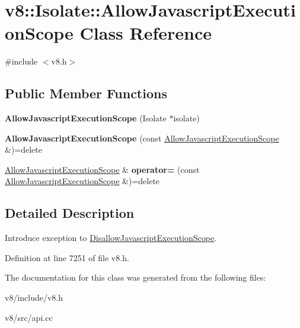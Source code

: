 \hypertarget{classv8_1_1Isolate_1_1AllowJavascriptExecutionScope}{}\section{v8\+:\+:Isolate\+:\+:Allow\+Javascript\+Execution\+Scope Class Reference}
\label{classv8_1_1Isolate_1_1AllowJavascriptExecutionScope}


{\ttfamily \#include $<$v8.\+h$>$}

\subsection*{Public Member Functions}
\begin{DoxyCompactItemize}
\item 
\mbox{\label{classv8_1_1Isolate_1_1AllowJavascriptExecutionScope_ac73a647c33756c6b7c3896170e069e8c}} 
{\bfseries Allow\+Javascript\+Execution\+Scope} (Isolate $\ast$isolate)
\item 
\mbox{\label{classv8_1_1Isolate_1_1AllowJavascriptExecutionScope_a20bf639420617b08404e2bed1b203dbc}} 
{\bfseries Allow\+Javascript\+Execution\+Scope} (const \mbox{\hyperlink{classv8_1_1Isolate_1_1AllowJavascriptExecutionScope}{Allow\+Javascript\+Execution\+Scope}} \&)=delete
\item 
\mbox{\label{classv8_1_1Isolate_1_1AllowJavascriptExecutionScope_a436e3fc96e3796ccfd265a153d71224a}} 
\mbox{\hyperlink{classv8_1_1Isolate_1_1AllowJavascriptExecutionScope}{Allow\+Javascript\+Execution\+Scope}} \& {\bfseries operator=} (const \mbox{\hyperlink{classv8_1_1Isolate_1_1AllowJavascriptExecutionScope}{Allow\+Javascript\+Execution\+Scope}} \&)=delete
\end{DoxyCompactItemize}


\subsection{Detailed Description}
Introduce exception to \mbox{\hyperlink{classv8_1_1Isolate_1_1DisallowJavascriptExecutionScope}{Disallow\+Javascript\+Execution\+Scope}}. 

Definition at line 7251 of file v8.\+h.



The documentation for this class was generated from the following files\+:\begin{DoxyCompactItemize}
\item 
v8/include/v8.\+h\item 
v8/src/api.\+cc\end{DoxyCompactItemize}

